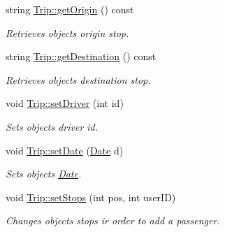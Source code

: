 \begin{DoxyCompactItemize}
string \hyperlink{group___trip_gaf63e96a9b31ad6def658944bc6a9f327}{Trip\+::get\+Origin} () const
\begin{DoxyCompactList}\small\item\em Retrieves object\textquotesingle{}s origin stop. \end{DoxyCompactList}\item 
string \hyperlink{group___trip_ga576ad0d4c7a723aa4b2d12ebdd4eec99}{Trip\+::get\+Destination} () const
\begin{DoxyCompactList}\small\item\em Retrieves object\textquotesingle{}s destination stop. \end{DoxyCompactList}\item 
void \hyperlink{group___trip_ga2c5c0c0315b210154ba190a5470ec110}{Trip\+::set\+Driver} (int id)
\begin{DoxyCompactList}\small\item\em Sets object\textquotesingle{}s driver id. \end{DoxyCompactList}\item 
void \hyperlink{group___trip_ga26abc8edc0cb1f5c2eb1b6e292152701}{Trip\+::set\+Date} (\hyperlink{class_date}{Date} d)
\begin{DoxyCompactList}\small\item\em Sets object\textquotesingle{}s \hyperlink{class_date}{Date}. \end{DoxyCompactList}\item 
void \hyperlink{group___trip_gaa294f1f8844c2b47676e0e985d81b2a0}{Trip\+::set\+Stops} (int pos, int user\+ID)
\begin{DoxyCompactList}\small\item\em Changes object\textquotesingle{}s stops ir order to add a passenger. \end{DoxyCompactList}\end{DoxyCompactItemize}
